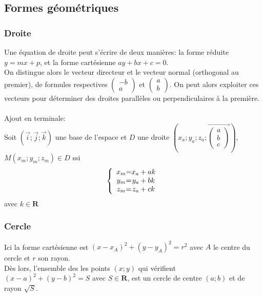 \documentclass{article}
\begin{document}
\subsection{Formes géométriques}

\subsubsection{Droite}
    Une équation de droite peut s'écrire de deux manières: la forme réduite $y=mx+p$, et la forme cartésienne $ay+bx+c=0$.\\
    On distingue alors le vecteur directeur et le vecteur normal (orthogonal au premier), de formules respectives $\begin{pmatrix}-b\\a\end{pmatrix}$ et $\begin{pmatrix}a\\b\end{pmatrix}$. On peut alors exploiter ces vecteurs pour déterminer des droites parallèles ou perpendiculaires à la première.
    \\\\
    Ajout en terminale:\\
    Soit $(\Vec{i};\Vec{j};\Vec{k})$ une base de l'espace et $D$ une droite $(x_a;y_a;z_a;\Vec{\begin{pmatrix}a\\b\\c\end{pmatrix}})$,\\ $M(x_m;y_m;z_m) \in D$ ssi  \[
                                \left \{
                                \begin{array}{c @{=} c}
                                    x_m & x_a + ak \\
                                    y_m & y_a + bk \\
                                    z_m & z_a + ck
                                \end{array}
                                \right.
                                \]
    avec $k \in \mathbf{R}$

\subsubsection{Cercle}
    Ici la forme cartésienne est $(x-x_A)^2+(y-y_A)^2 = r^2$ avec $A$ le centre du cercle et $r$ son rayon.\\
    Dès lors, l'ensemble des les points $(x;y)$ qui vérifient $(x-a)^2+(y-b)^2 = S$ avec $S\in\mathbf{R}$, est un cercle de centre $(a;b)$ et de rayon $\sqrt{S}$.
\end{document}
